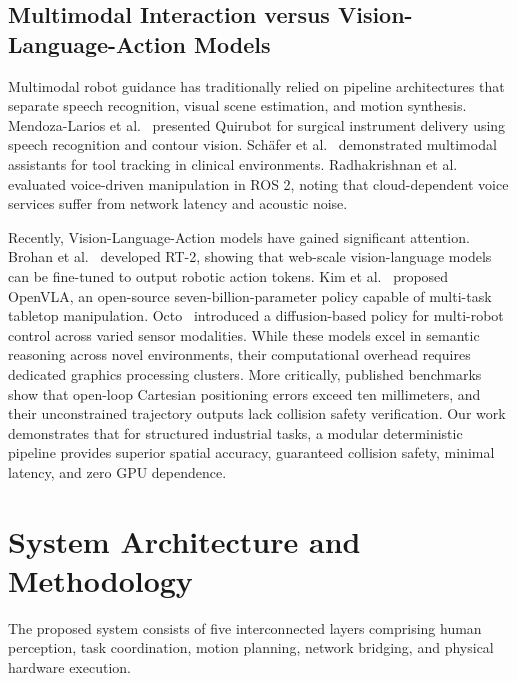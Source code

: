 \documentclass[runningheads]{llncs}
\begin{document}
\subsection{Multimodal Interaction versus Vision-Language-Action Models}
Multimodal robot guidance has traditionally relied on pipeline architectures that separate speech recognition, visual scene estimation, and motion synthesis. Mendoza-Larios et al.~\cite{quirubot2016} presented Quirubot for surgical instrument delivery using speech recognition and contour vision. Schäfer et al.~\cite{schafer2023smart} demonstrated multimodal assistants for tool tracking in clinical environments. Radhakrishnan et al.~\cite{voice_ros2_2024} evaluated voice-driven manipulation in ROS 2, noting that cloud-dependent voice services suffer from network latency and acoustic noise.

Recently, Vision-Language-Action models have gained significant attention. Brohan et al.~\cite{rt2_2023} developed RT-2, showing that web-scale vision-language models can be fine-tuned to output robotic action tokens. Kim et al.~\cite{openvla2024} proposed OpenVLA, an open-source seven-billion-parameter policy capable of multi-task tabletop manipulation. Octo~\cite{octo2024} introduced a diffusion-based policy for multi-robot control across varied sensor modalities. While these models excel in semantic reasoning across novel environments, their computational overhead requires dedicated graphics processing clusters. More critically, published benchmarks show that open-loop Cartesian positioning errors exceed ten millimeters, and their unconstrained trajectory outputs lack collision safety verification. Our work demonstrates that for structured industrial tasks, a modular deterministic pipeline provides superior spatial accuracy, guaranteed collision safety, minimal latency, and zero GPU dependence.

\section{System Architecture and Methodology}
\label{sec:methodology}

The proposed system consists of five interconnected layers comprising human perception, task coordination, motion planning, network bridging, and physical hardware execution.
\end{document}
